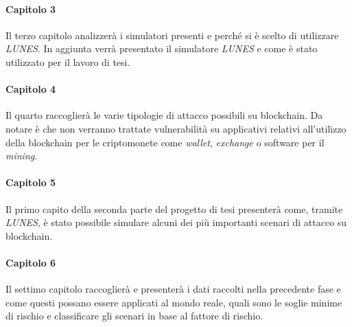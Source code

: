 \paragraph{Capitolo 3}
Il terzo capitolo analizzerà i simulatori presenti e perché si è scelto di utilizzare \textit{LUNES}.
In aggiunta verrà presentato il simulatore \textit{LUNES} e come è stato utilizzato per il lavoro di tesi.

\paragraph{Capitolo 4}
Il quarto raccoglierà le varie tipologie di attacco possibili su blockchain. Da notare è che non verranno trattate vulnerabilità su applicativi relativi all'utilizzo della blockchain per le criptomonete come \textit{wallet}, \textit{exchange} o software per il \textit{mining}.

\paragraph{Capitolo 5}
Il primo capito della seconda parte del progetto di tesi presenterà come, tramite \textit{LUNES}, è stato possibile simulare alcuni dei più importanti scenari di attacco su blockchain.

\paragraph{Capitolo 6}
Il settimo capitolo raccoglierà e presenterà i dati raccolti nella precedente fase e come questi possano essere applicati al mondo reale, quali sono le soglie minime di rischio e classificare gli scenari in base al fattore di rischio.

